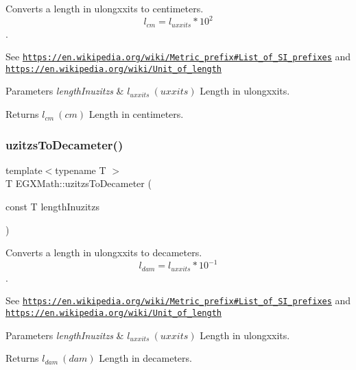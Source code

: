 Converts a length in ulongxxits to centimeters. \[ l_{cm}=l_{uxxits} * 10^{2} \]. 

See \href{https://en.wikipedia.org/wiki/Metric_prefix#List_of_SI_prefixes}{\tt https\+://en.\+wikipedia.\+org/wiki/\+Metric\+\_\+prefix\#\+List\+\_\+of\+\_\+\+S\+I\+\_\+prefixes} and \href{https://en.wikipedia.org/wiki/Unit_of_length}{\tt https\+://en.\+wikipedia.\+org/wiki/\+Unit\+\_\+of\+\_\+length} 
\begin{DoxyParams}{Parameters}
{\em length\+Inuzitzs} & $ l_{uxxits}\ (uxxits)$ Length in ulongxxits. \\
\hline
\end{DoxyParams}
\begin{DoxyReturn}{Returns}
$ l_{cm}\ (cm)$ Length in centimeters. 
\end{DoxyReturn}
\mbox{\label{group___e_g_x_math-_conversions-_length_conversions-_non-_s_i-uzitzs-_s_i_ga62dcf7a675d92ce74d56e67f2fed7ace}} 
\subsubsection{\texorpdfstring{uzitzs\+To\+Decameter()}{uzitzsToDecameter()}}
{\footnotesize\ttfamily template$<$typename T $>$ \\
T E\+G\+X\+Math\+::uzitzs\+To\+Decameter (\begin{DoxyParamCaption}\item[{const T}]{length\+Inuzitzs }\end{DoxyParamCaption})}



Converts a length in ulongxxits to decameters. \[ l_{dam}=l_{uxxits} * 10^{-1} \]. 

See \href{https://en.wikipedia.org/wiki/Metric_prefix#List_of_SI_prefixes}{\tt https\+://en.\+wikipedia.\+org/wiki/\+Metric\+\_\+prefix\#\+List\+\_\+of\+\_\+\+S\+I\+\_\+prefixes} and \href{https://en.wikipedia.org/wiki/Unit_of_length}{\tt https\+://en.\+wikipedia.\+org/wiki/\+Unit\+\_\+of\+\_\+length} 
\begin{DoxyParams}{Parameters}
{\em length\+Inuzitzs} & $ l_{uxxits}\ (uxxits)$ Length in ulongxxits. \\
\hline
\end{DoxyParams}
\begin{DoxyReturn}{Returns}
$ l_{dam}\ (dam)$ Length in decameters. 
\end{DoxyReturn}
\mbox{\label{group___e_g_x_math-_conversions-_length_conversions-_non-_s_i-uzitzs-_s_i_ga178324834750df4df1026a8900fadbcc}} 
